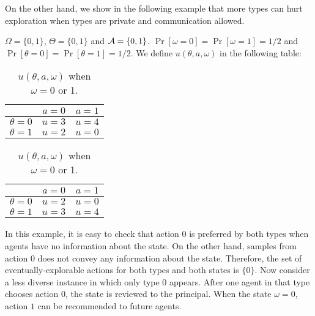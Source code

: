 On the other hand, we show in the following example that more types can hurt exploration when types are private and communication allowed. 

\begin{example}
$\varOmega = \{0,1\}$, $\varTheta = \{0,1\}$ and $\mathcal{A} =\{0,1\}$. $\Pr[\omega =0] =\Pr[\omega =1] = 1/2$ and $\Pr[\theta = 0] = \Pr[\theta=1] =1/2$. We define $u(\theta, a, \omega)$ in the following table:\\
\begin{table}[H]
\centering
\begin{tabular}{|c||c|c|}
\hline
&$a=0$&$a=1$\\
\hline
\hline
$\theta = 0$& $u = 3$ & $u =4$\\
\hline
$\theta = 1$& $u = 2$ & $u =0$\\
\hline
\end{tabular}
\quad
\begin{tabular}{|c||c|c|}
\hline
&$a=0$&$a=1$\\
\hline
\hline
$\theta = 0$& $u = 2$ & $u =0$\\
\hline
$\theta = 1$& $u = 3$ & $u =4$\\
\hline
\end{tabular}
\caption{$u(\theta,a,\omega)$ when $\omega =0 $ or 1.}
\end{table}

\end{example}

In this example, it is easy to check that action 0 is preferred by both types when agents have no information about the state. On the other hand, samples from action 0 does not convey any information about the state. Therefore, the set of eventually-explorable actions for both types and both states is $\{0\}$. Now consider a less diverse instance in which only type 0 appears. After one agent in that type chooses action 0, the state is reviewed to the principal. When the state $\omega = 0$, action $1$ can be recommended to future agents. 